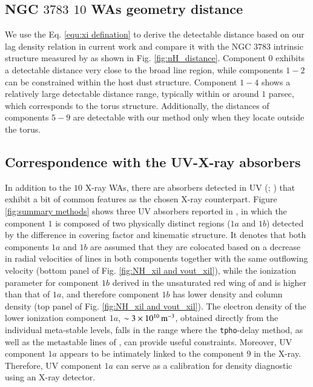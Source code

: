 \documentclass{aa}
\begin{document}
\subsection{NGC $3783$ $10$ WAs geometry distance}
We use the Eq. \ref{equ:xi defination} to derive the detectable distance based on our lag density relation in current work and compare it with the NGC $3783$ intrinsic structure measured by \cite{GRAVITYCollaboration2021A&A} as shown in Fig. \ref{fig:nH_distance}.
Component $0$ exhibits a detectable distance very close to the broad line region, while components $1-2$ can be constrained within the host dust structure. Component $1-4$ shows a relatively large detectable distance range, typically within or around $1$ parsec, which corresponds to the torus structure. Additionally, the distances of components $5-9$ are detectable with our method only when they locate outside the torus.

%




\subsection{Correspondence with the UV-X-ray absorbers}

In addition to the $10$ X-ray WAs, there are absorbers detected in UV (\citealp{Kraemer2001ApJ}; \citealp{Gabel2005ApJ}) that exhibit a bit of common features as the chosen X-ray counterpart.
Figure \ref{fig:summary methods} shows three UV absorbers reported in \cite{Gabel2005ApJ}, in which the component $1$ is composed of two physically distinct regions ($1a$ and $1b$) detected by the difference in covering factor and kinematic structure.
It denotes that both components $1a$ and $1b$ are assumed that they are colocated based on a decrease in radial velocities of lines in both components together with the same outflowing velocity (bottom panel of Fig. \ref{fig:NH_xil and vout_xil}), while the ionization parameter for component $1b$ derived in the unsaturated red wing of  and  is higher than that of $1a$, and therefore component $1b$ has lower density and column density (top panel of Fig. \ref{fig:NH_xil and vout_xil}). 
The electron density of the lower ionization component $1a$, $\sim 3\times 10^{10} \, \rm m^{-3}$, obtained directly from the individual meta-stable levels, falls in the range where the \texttt{tpho}-delay method, as well as the metastable lines of , can provide useful constraints.
Moreover, UV component $1a$ appears to be intimately linked to the component $9$ in the X-ray.
Therefore, UV component $1a$ can serve as a calibration for density diagnostic using an X-ray detector.
\end{document}
